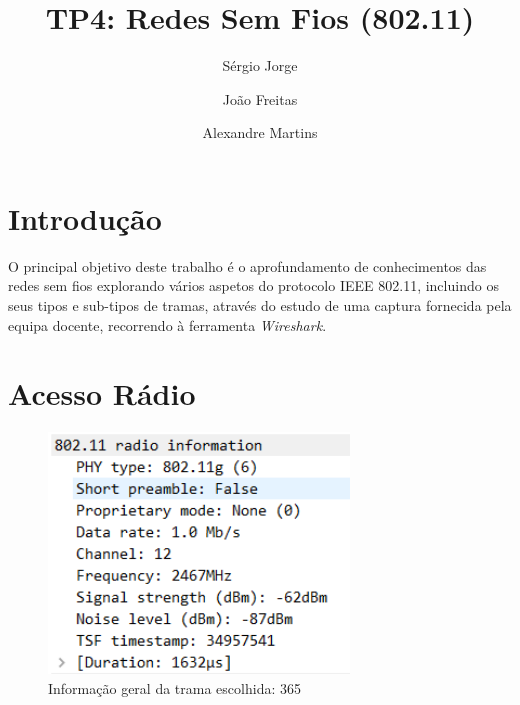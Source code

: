 \documentclass{llncs}
\begin{document}
\mainmatter
\title{TP4: Redes Sem Fios (802.11)}


\author{Sérgio Jorge \and João Freitas \and Alexandre Martins}




\date{}


\maketitle

\section{Introdução}
\hspace{3mm} 

O principal objetivo deste trabalho é o aprofundamento de conhecimentos das redes sem fios explorando vários aspetos do protocolo IEEE 802.11, incluindo os seus tipos e sub-tipos de tramas, através do estudo de uma captura fornecida pela equipa docente, recorrendo à ferramenta \textit{Wireshark}. 

\clearpage

\section{Acesso Rádio}

\begin{figure}[H]
\includegraphics[width=8cm]{parte1global.PNG}
\caption{Informação geral da trama escolhida: 365}
\end{figure}
\end{document}

